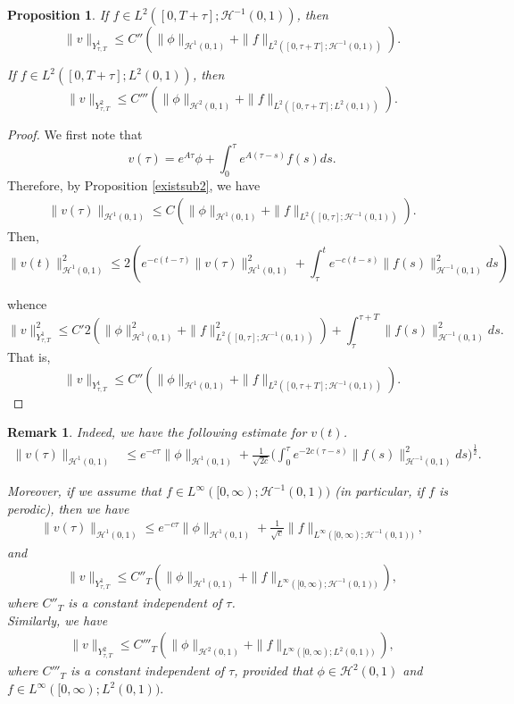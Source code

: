 \documentclass[10pt,a4paper,final]{article}
\numberwithin{equation}{section}
\newtheorem{prop}[theorem]{Proposition}
\newtheorem{remark}[theorem]{Remark}
\newcommand{\cH}{\mathcal{H}}
\begin{document}
\begin{prop}\label{Prop2}
If $f\in L^{2}([0,T+\tau];\cH^{-1}(0,1))$, then 
 $$\|v\|_{Y^{1}_{\tau,T}}\leq C''(\|\phi\|_{\cH^{1}(0,1)}+\|f\|_{L^2([0,\tau+T];\cH^{-1}(0,1))}).$$

If $f\in L^{2}([0,T+\tau];L^2(0,1))$, then 
 $$\|v\|_{Y^{2}_{\tau,T}}\leq C'''(\|\phi\|_{\cH^{2}(0,1)}+\|f\|_{L^2([0,\tau+T];L^2(0,1))}).$$

\end{prop}
\begin{proof}
    We first note that 
    $$v(\tau)=e^{A\tau}\phi+\int_0^{\tau}e^{A(\tau-s)}f(s)ds.$$
    Therefore, by Proposition \ref{existsub2}, we have
    \begin{align*}
        \|v(\tau)\|_{\cH^{1}(0,1)}\leq C(\|\phi\|_{\cH^{1}(0,1)}+\|f\|_{L^2([0,\tau];\cH^{-1}(0,1))}).
    \end{align*}
    Then, 
    $$\|v(t)\|_{\cH^{1}(0,1)}^2 \leq 2(e^{-c(t-\tau)}\|v(\tau)\|_{\cH^{1}(0,1)}^2+\int_{\tau}^{t}e^{-c(t-s)}\|f(s)\|_{\cH^{-1}(0,1)}^2ds)$$
    
    whence 
    $$\|v\|^2_{Y^{1}_{\tau,T}}\leq C' 2(\|\phi\|_{\cH^{1}(0,1)}^2+\|f\|_{L^2([0,\tau];\cH^{-1}(0,1))}^2)+\int_{\tau}^{\tau+T}\|f(s)\|_{\cH^{-1}(0,1)}^2ds.$$
    That is,
    $$\|v\|_{Y^{1}_{\tau,T}}\leq C''(\|\phi\|_{\cH^{1}(0,1)}+\|f\|_{L^2([0,\tau+T];\cH^{-1}(0,1))}).$$
\end{proof}
\begin{remark} \label{rmkforfinLinfty}
Indeed, we have the following estimate for $v(t)$.
\begin{align*}
    \|v(\tau)\|_{\cH^{1}(0,1)}%
    &\leq e^{-c\tau}\|\phi\|_{\cH^{1}(0,1)}+\frac{1}{\sqrt{2c}} \bigg(\int_0^{\tau}e^{-2c(\tau-s)}\|f(s)\|^2_{\cH^{-1}(0,1)}ds\bigg)^{\frac12}.
\end{align*}

    Moreover, if we assume that $f\in L^{\infty}([0,\infty); \cH^{-1}(0,1))$ (in particular, if $f$ is perodic), then we have
    \begin{align*}
        \|v(\tau)\|_{\cH^{1}(0,1)}\leq e^{-c\tau}\|\phi\|_{\cH^{1}(0,1)}+\frac{1}{\sqrt{c}}\|f\|_{L^{\infty}([0,\infty);\cH^{-1}(0,1))},
    \end{align*}
    and
    \begin{align}\label{estimateA}
        \|v\|_{Y^{1}_{\tau,T}}\leq C''_T (\|\phi\|_{\cH^{1}(0,1)}+\|f\|_{L^{\infty}([0,\infty);\cH^{-1}(0,1))}),
    \end{align}
    where $C''_T$ is a constant independent of $\tau$.\\

    Similarly, we have   \begin{align}\label{estimateB}
        \|v\|_{Y^{2}_{\tau,T}}\leq C'''_T (\|\phi\|_{\cH^{2}(0,1)}+\|f\|_{L^{\infty}([0,\infty);L^2(0,1))}),
    \end{align}
    where $C'''_T$ is a constant independent of $\tau$, provided that $\phi\in\cH^2(0,1)$ and $f\in L^{\infty}([0,\infty); L^2(0,1)).$ 
\end{remark}
\end{document}
